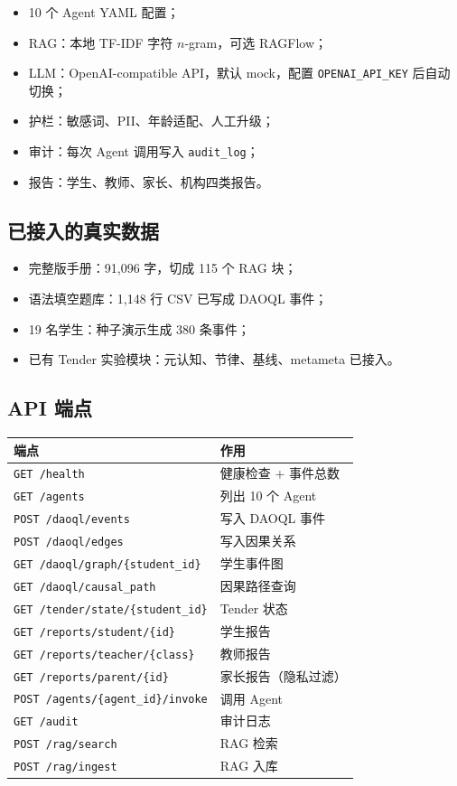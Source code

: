 \documentclass[UTF8,a4paper,11pt]{ctexart}
\begin{document}
\begin{itemize}[leftmargin=2em]
\item 10 个 Agent YAML 配置；
\item RAG：本地 TF-IDF 字符 $n$-gram，可选 RAGFlow；
\item LLM：OpenAI-compatible API，默认 mock，配置 \texttt{OPENAI\_API\_KEY} 后自动切换；
\item 护栏：敏感词、PII、年龄适配、人工升级；
\item 审计：每次 Agent 调用写入 \texttt{audit\_log}；
\item 报告：学生、教师、家长、机构四类报告。
\end{itemize}

\subsection{已接入的真实数据}

\begin{itemize}[leftmargin=2em]
\item 完整版手册：91{,}096 字，切成 115 个 RAG 块；
\item 语法填空题库：1{,}148 行 CSV 已写成 DAOQL 事件；
\item 19 名学生：种子演示生成 380 条事件；
\item 已有 Tender 实验模块：元认知、节律、基线、metameta 已接入。
\end{itemize}

\subsection{API 端点}

\begin{longtable}{@{}p{6.4cm}p{7.0cm}@{}}
\toprule
\textbf{端点} & \textbf{作用} \\
\midrule
\texttt{GET /health} & 健康检查 + 事件总数 \\
\texttt{GET /agents} & 列出 10 个 Agent \\
\texttt{POST /daoql/events} & 写入 DAOQL 事件 \\
\texttt{POST /daoql/edges} & 写入因果关系 \\
\texttt{GET /daoql/graph/\{student\_id\}} & 学生事件图 \\
\texttt{GET /daoql/causal\_path} & 因果路径查询 \\
\texttt{GET /tender/state/\{student\_id\}} & Tender 状态 \\
\texttt{GET /reports/student/\{id\}} & 学生报告 \\
\texttt{GET /reports/teacher/\{class\}} & 教师报告 \\
\texttt{GET /reports/parent/\{id\}} & 家长报告（隐私过滤） \\
\texttt{POST /agents/\{agent\_id\}/invoke} & 调用 Agent \\
\texttt{GET /audit} & 审计日志 \\
\texttt{POST /rag/search} & RAG 检索 \\
\texttt{POST /rag/ingest} & RAG 入库 \\
\bottomrule
\end{longtable}
\end{document}
